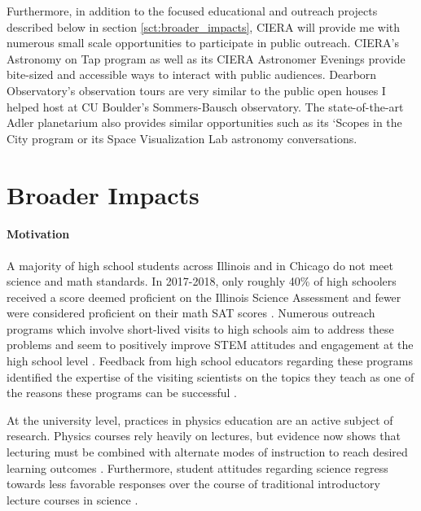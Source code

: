 \documentclass[11pt, preprint]{aastex}
\begin{document}
Furthermore, in addition to the focused educational and outreach projects described below in section \ref{sct:broader_impacts}, CIERA will provide me with numerous small scale opportunities to participate in public outreach.
CIERA's Astronomy on Tap program as well as its CIERA Astronomer Evenings provide bite-sized and accessible ways to interact with public audiences.
Dearborn Observatory's observation tours are very similar to the public open houses I helped host at CU Boulder's Sommers-Bausch observatory.
The state-of-the-art Adler planetarium also provides similar opportunities such as its `Scopes in the City program or its Space Visualization Lab astronomy conversations.


\vspace{-17pt}
\section{Broader Impacts}
\vspace{-11pt}
\label{sct:broader_impacts}

\paragraph{Motivation}
A majority of high school students across Illinois and in Chicago do not meet science and math standards.
In 2017-2018, only roughly 40\% of high schoolers received a score deemed proficient on the Illinois Science Assessment and fewer were considered proficient on their math SAT scores \citep{irc2018}.
Numerous outreach programs which involve short-lived visits to high schools aim to address these problems and seem to positively improve STEM attitudes and engagement at the high school level \citep{vennix&all2017, vennix&all2018}.
Feedback from high school educators regarding these programs identified the expertise of the visiting scientists on the topics they teach as one of the reasons these programs can be successful \citep{laursen&all2007}.

At the university level, practices in physics education are an active subject of research.
Physics courses rely heavily on lectures, but evidence now shows that lecturing must be combined with alternate modes of instruction to reach desired learning outcomes \citep{meltzer&thornton2012}.
Furthermore, student attitudes regarding science regress towards less favorable responses over the course of traditional introductory lecture courses in science \citep{reddish&all1998}.
\end{document}
